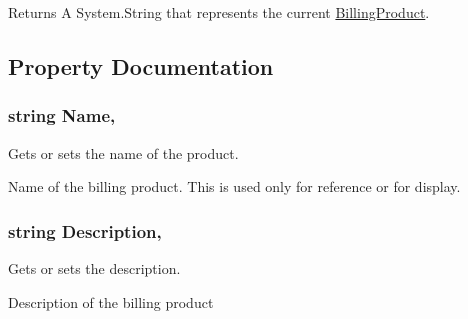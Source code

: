 \begin{DoxyReturn}{Returns}
A System.\+String that represents the current \hyperlink{class_voxel_busters_1_1_native_plugins_1_1_billing_product}{Billing\+Product}.
\end{DoxyReturn}


\subsection{Property Documentation}
\hypertarget{class_voxel_busters_1_1_native_plugins_1_1_billing_product_a7ee9065718e6628dc7791b756fa6c0f9}{}
\subsubsection[{Name}]{\setlength{\rightskip}{0pt plus 5cm}string Name\hspace{0.3cm}{\ttfamily [get]}, {\ttfamily [set]}}\label{class_voxel_busters_1_1_native_plugins_1_1_billing_product_a7ee9065718e6628dc7791b756fa6c0f9}


Gets or sets the name of the product. 

Name of the billing product. This is used only for reference or for display.\hypertarget{class_voxel_busters_1_1_native_plugins_1_1_billing_product_a34409fed9d39281ada2d7ec172a52f9b}{}
\subsubsection[{Description}]{\setlength{\rightskip}{0pt plus 5cm}string Description\hspace{0.3cm}{\ttfamily [get]}, {\ttfamily [set]}}\label{class_voxel_busters_1_1_native_plugins_1_1_billing_product_a34409fed9d39281ada2d7ec172a52f9b}


Gets or sets the description. 

Description of the billing product \hypertarget{class_voxel_busters_1_1_native_plugins_1_1_billing_product_a53a97d6cef9b971855e7ac9fe437fec9}{}
